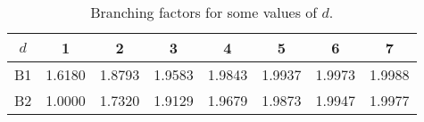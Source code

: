 \begin{table}[!htb]
    \centering
    \begin{tabular}{c|ccccccc}
         $d$ & 1 & 2 & 3 & 4 & 5 & 6 & 7\\
         \hline
         B1 & 1.6180 & 1.8793 & 1.9583 & 1.9843 & 1.9937 & 1.9973 & 1.9988 \\
         B2 & 1.0000 & 1.7320 & 1.9129 & 1.9679 & 1.9873 & 1.9947 & 1.9977 \\

    \end{tabular}\medskip
    \caption{Branching factors for some values of $d$.}
    \label{tab:exact_values}
\end{table}